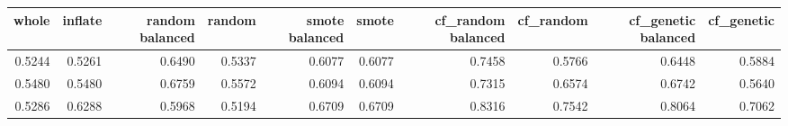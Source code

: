 \begin{tabular}{rrrrrrrrrr}
\toprule

 whole &  inflate &  random balanced &  random &  smote balanced &  smote &  cf\_random balanced &  cf\_random &  cf\_genetic balanced &  cf\_genetic \\
\midrule

0.5244 &   0.5261 &           0.6490 &  0.5337 &          0.6077 & 0.6077 &              0.7458 &     0.5766 &               0.6448 &      0.5884 \\
0.5480 &   0.5480 &           0.6759 &  0.5572 &          0.6094 & 0.6094 &              0.7315 &     0.6574 &               0.6742 &      0.5640 \\
0.5286 &   0.6288 &           0.5968 &  0.5194 &          0.6709 & 0.6709 &              0.8316 &     0.7542 &               0.8064 &      0.7062 \\

\bottomrule
\end{tabular}
